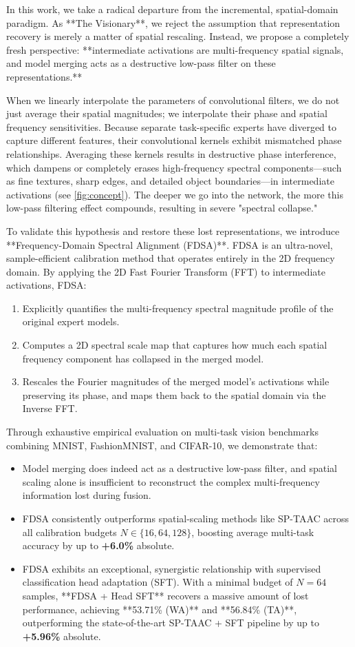 \documentclass{article}
\begin{document}
In this work, we take a radical departure from the incremental, spatial-domain paradigm. As **The Visionary**, we reject the assumption that representation recovery is merely a matter of spatial rescaling. Instead, we propose a completely fresh perspective: **intermediate activations are multi-frequency spatial signals, and model merging acts as a destructive low-pass filter on these representations.** 

When we linearly interpolate the parameters of convolutional filters, we do not just average their spatial magnitudes; we interpolate their phase and spatial frequency sensitivities. Because separate task-specific experts have diverged to capture different features, their convolutional kernels exhibit mismatched phase relationships. Averaging these kernels results in destructive phase interference, which dampens or completely erases high-frequency spectral components—such as fine textures, sharp edges, and detailed object boundaries—in intermediate activations (see \cref{fig:concept}). The deeper we go into the network, the more this low-pass filtering effect compounds, resulting in severe "spectral collapse."

To validate this hypothesis and restore these lost representations, we introduce **Frequency-Domain Spectral Alignment (FDSA)**. FDSA is an ultra-novel, sample-efficient calibration method that operates entirely in the 2D frequency domain. By applying the 2D Fast Fourier Transform (FFT) to intermediate activations, FDSA:
\begin{enumerate}
    \item Explicitly quantifies the multi-frequency spectral magnitude profile of the original expert models.
    \item Computes a 2D spectral scale map that captures how much each spatial frequency component has collapsed in the merged model.
    \item Rescales the Fourier magnitudes of the merged model's activations while preserving its phase, and maps them back to the spatial domain via the Inverse FFT.
\end{enumerate}

Through exhaustive empirical evaluation on multi-task vision benchmarks combining MNIST, FashionMNIST, and CIFAR-10, we demonstrate that:
\begin{itemize}
    \item Model merging does indeed act as a destructive low-pass filter, and spatial scaling alone is insufficient to reconstruct the complex multi-frequency information lost during fusion.
    \item FDSA consistently outperforms spatial-scaling methods like SP-TAAC across all calibration budgets $N \in \{16, 64, 128\}$, boosting average multi-task accuracy by up to \textbf{+6.0\%} absolute.
    \item FDSA exhibits an exceptional, synergistic relationship with supervised classification head adaptation (SFT). With a minimal budget of $N=64$ samples, **FDSA + Head SFT** recovers a massive amount of lost performance, achieving **53.71\% (WA)** and **56.84\% (TA)**, outperforming the state-of-the-art SP-TAAC + SFT pipeline by up to \textbf{+5.96\%} absolute.
\end{itemize}
\end{document}
